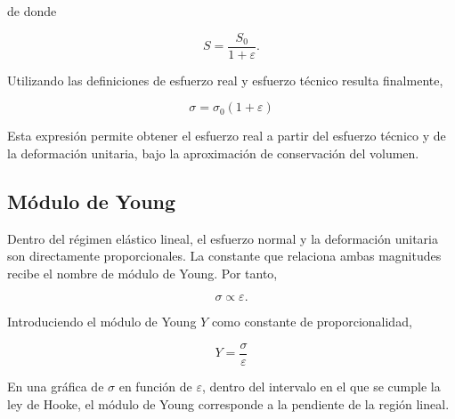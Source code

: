 \documentclass[11pt,a4paper]{article}
\begin{document}
de donde

\[
S=\frac{S_0}{1+\varepsilon}.
\]

Utilizando las definiciones de esfuerzo real y esfuerzo técnico resulta finalmente,

\begin{equation}
\boxed{\sigma=\sigma_0(1+\varepsilon)}
\label{eq:esfuerzo_real_tecnico}
\end{equation}

Esta expresión permite obtener el esfuerzo real a partir del esfuerzo
técnico y de la deformación unitaria, bajo la aproximación de conservación
del volumen.


\subsection{Módulo de Young}

Dentro del régimen elástico lineal, el esfuerzo normal y la deformación
unitaria son directamente proporcionales. La constante que relaciona ambas
magnitudes recibe el nombre de módulo de Young. Por tanto,

\[
\sigma\propto\varepsilon.
\]

Introduciendo el módulo de Young $Y$ como constante de proporcionalidad,

\begin{equation}
\boxed{Y=\frac{\sigma}{\varepsilon}}
\label{eq:modulo_young}
\end{equation}

En una gráfica de $\sigma$ en función de $\varepsilon$, dentro del intervalo
en el que se cumple la ley de Hooke, el módulo de Young corresponde a la
pendiente de la región lineal.


\end{document}
